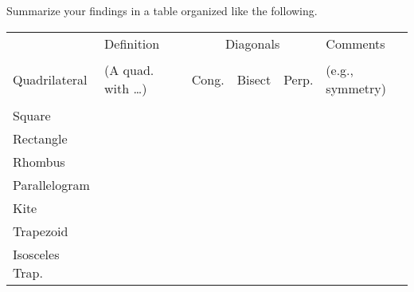 \documentclass{ximera}
\begin{document}
\newpage
\begin{problem}
Summarize your findings in a table organized like the following.  
{
\renewcommand\arraystretch{2.8}
\renewcommand\tabcolsep{12pt}
\begin{table}[h]
\begin{tabular}{|l|p{4cm}|c|c|c|p{4cm}|}
\hline 
 & Definition  & \multicolumn{3}{c|}{Diagonals} &  Comments \\  %
Quadrilateral & (A quad. with \dots) & \begin{sideways}Cong.\end{sideways} & 
\begin{sideways}Bisect\end{sideways} & \begin{sideways}Perp.\end{sideways} & (e.g., symmetry) \\ \hline\hline
Square           &            &   &  &         &                  \\  \hline
Rectangle       &           &   &  &         &                  \\ \hline
Rhombus        &           &   &  &         &                  \\ \hline
Parallelogram &           &   &  &         &                  \\ \hline
Kite                &           &   &  &          &                  \\ \hline
Trapezoid       &           &   &  &         &                  \\ \hline
Isosceles Trap.       &           &   &  &         &                  \\ \hline
\end{tabular}
\end{table}
}
\end{problem}
\end{document}
